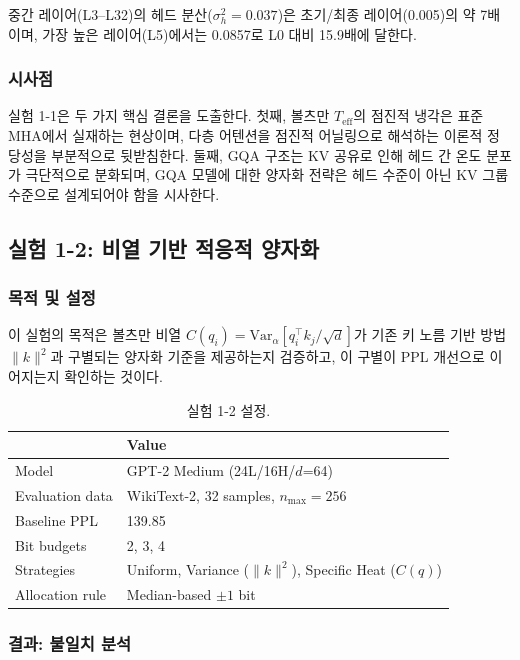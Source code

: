 \documentclass[11pt,a4paper]{article}
\begin{document}
중간 레이어(L3--L32)의 헤드 분산($\sigma^2_h = 0.037$)은 초기/최종 레이어(0.005)의 약 7배이며, 가장 높은 레이어(L5)에서는 0.0857로 L0 대비 15.9배에 달한다.

\subsubsection{시사점}

실험 1-1은 두 가지 핵심 결론을 도출한다.
첫째, 볼츠만 $T_\mathrm{eff}$의 점진적 냉각은 표준 MHA에서 실재하는 현상이며, 다층 어텐션을 점진적 어닐링으로 해석하는 이론적 정당성을 부분적으로 뒷받침한다.
둘째, GQA 구조는 KV 공유로 인해 헤드 간 온도 분포가 극단적으로 분화되며, GQA 모델에 대한 양자화 전략은 헤드 수준이 아닌 KV 그룹 수준으로 설계되어야 함을 시사한다.

\subsection{실험 1-2: 비열 기반 적응적 양자화}

\subsubsection{목적 및 설정}

이 실험의 목적은 볼츠만 비열 $C(q_i) = \mathrm{Var}_\alpha[q_i^\top k_j / \sqrt{d}]$가 기존 키 노름 기반 방법 $\|k\|^2$과 구별되는 양자화 기준을 제공하는지 검증하고, 이 구별이 PPL 개선으로 이어지는지 확인하는 것이다.

\begin{table}[H]
\centering
\caption{실험 1-2 설정.}
\label{tab:exp12_setup}
\begin{tabular}{ll}
\toprule
\textbf{} & \textbf{Value} \\
\midrule
Model & GPT-2 Medium (24L/16H/$d$=64) \\
Evaluation data & WikiText-2, 32 samples, $n_\mathrm{max}=256$ \\
Baseline PPL & 139.85 \\
Bit budgets & 2, 3, 4 \\
Strategies & Uniform, Variance ($\|k\|^2$), Specific Heat ($C(q)$) \\
Allocation rule & Median-based $\pm 1$ bit \\
\bottomrule
\end{tabular}
\end{table}

\subsubsection{결과: 불일치 분석}
\end{document}
